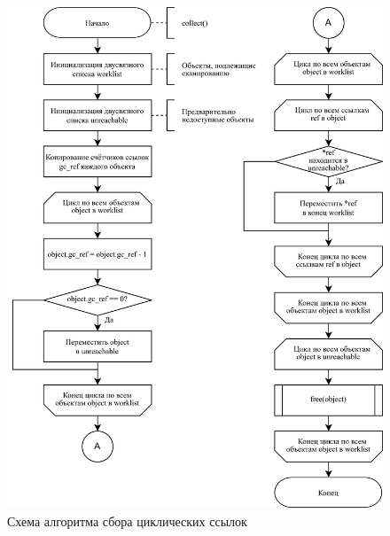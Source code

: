 \begin{figure}[H]
	\centering
	\includegraphics[scale=0.175]{assets/python-gc.png}
	\caption{Схема алгоритма сбора циклических ссылок}
	\label{fig:python-gc}
\end{figure}

